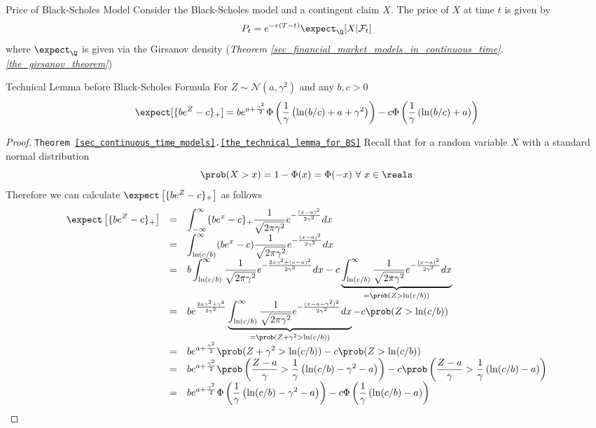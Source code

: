 \documentclass[11pt,a4paper]{article}
\begin{document}
  \begin{proposition}{Price of Black-Scholes Model}\label{prop_price_of_black_scholes_continuous}
    Consider the Black-Scholes model and a contingent claim $X$. The price of $X$ at time $t$ is given by
    \[ P_t=e^{-r(T-t)}\expect_\Q[X|\mathcal{F}_t] \]
    where $\expect_\Q$ is given via the Girsanov density (\textit{Theorem \ref{sec_financial_market_models_in_continuous_time}.\ref{the_girsanov_theorem}})
  \end{proposition}

  \begin{theorem}{Technical Lemma before Black-Scholes Formula}\label{the_technical_lemma_for_BS}
    For $Z\sim\mathcal{N}(a,\gamma^2)$ and any $b,c>0$
    \[ \expect[\{be^Z-c\}_+]=be^{a+\frac{\gamma^2}2}\Phi\left(\frac1\gamma\left(\ln(b/c)+a+\gamma^2\right)\right)-c\Phi\left(\frac1\gamma\left(\ln(b/c)+a\right)\right) \]
  \end{theorem}

  \begin{proof}{\texttt{Theorem \ref{sec_continuous_time_models}.\ref{the_technical_lemma_for_BS}}}
    Recall that for a random variable $X$ with a standard normal distribution
    \[ \prob(X>x)=1-\Phi(x)=\Phi(-x)\ \forall\ x\in\reals \]
    Therefore we can calculate $\expect\left[\{be^Z-c\}_+\right]$ as follows
    \[\everymath={\displaystyle}\begin{array}{rcl}
      \expect\left[\{be^Z-c\}_+\right]&=&\int_{-\infty}^\infty\{be^x-c\}_+\frac1{\sqrt{2\pi\gamma^2}}e^{-\frac{(x-a)^2}{2\gamma^2}}dx\\
      &=&\int_{\ln(c/b)}^\infty(be^x-c)\frac1{\sqrt{2\pi\gamma^2}}e^{-\frac{(x-a)^2}{2\gamma^2}}dx\\
      &=&b\int_{\ln(c/b)}^\infty\frac1{\sqrt{2\pi\gamma^2}}e^{-\frac{2x\gamma^2+(x-a)^2}{2\gamma^2}}dx-c\underbrace{\int_{\ln(c/b)}^\infty\frac1{\sqrt{2\pi\gamma^2}}e^{-\frac{(x-a)^2}{2\gamma^2}}dx}_{=\prob(Z>\ln(c/b))}\\
      &=&be^{\frac{2a\gamma^2+\gamma^4}{2\gamma^2}}\underbrace{\int_{\ln(c/b)}^\infty\frac1{\sqrt{2\pi\gamma^2}}e^{-\frac{(x-a-\gamma^2)^2}{2\gamma^2}}dx}_{=\prob(Z+\gamma^2>\ln(c/b))}-c\prob(Z>\ln(c/b))\\
      &=&be^{a+\frac{\gamma^2}2}\prob(Z+\gamma^2>\ln(c/b))-c\prob(Z>\ln(c/b))\\
      &=&be^{a+\frac{\gamma^2}2}\prob\left(\frac{Z-a}\gamma>\frac1\gamma\left(\ln(c/b)-\gamma^2-a\right)\right)-c\prob\left(\frac{Z-a}\gamma>\frac1\gamma\left(\ln(c/b)-a\right)\right)\\
      &=&be^{a+\frac{\gamma^2}2}\Phi\left(\frac1\gamma\left(\ln(c/b)-\gamma^2-a\right)\right)-c\Phi\left(\frac1\gamma\left(\ln(c/b)-a\right)\right)\\
    \end{array}\]
    \proved
  \end{proof}
\end{document}
